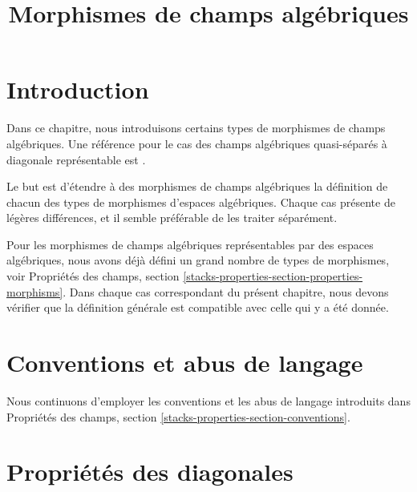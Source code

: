 

%


\title{Morphismes de champs algébriques}


\maketitle

\label{section-phantom}

\tableofcontents

\section{Introduction}
\label{section-introduction}

\noindent
Dans ce chapitre, nous introduisons certains types de morphismes de champs
algébriques. Une référence pour le cas des champs algébriques quasi-séparés à
diagonale représentable est \cite{LM-B}.

\medskip\noindent
Le but est d'étendre à des morphismes de champs algébriques la définition de
chacun des types de morphismes d'espaces algébriques. Chaque cas présente de
légères différences, et il semble préférable de les traiter séparément.

\medskip\noindent
Pour les morphismes de champs algébriques représentables par des espaces
algébriques, nous avons déjà défini un grand nombre de types de morphismes, voir
Propriétés des champs,
section \ref{stacks-properties-section-properties-morphisms}.
Dans chaque cas correspondant du présent chapitre, nous devons vérifier que la
définition générale est compatible avec celle qui y a été donnée.




\section{Conventions et abus de langage}
\label{section-conventions}

\noindent
Nous continuons d'employer les conventions et les abus de langage introduits
dans Propriétés des champs, section
\ref{stacks-properties-section-conventions}.




\section{Propriétés des diagonales}
\label{section-diagonals}

